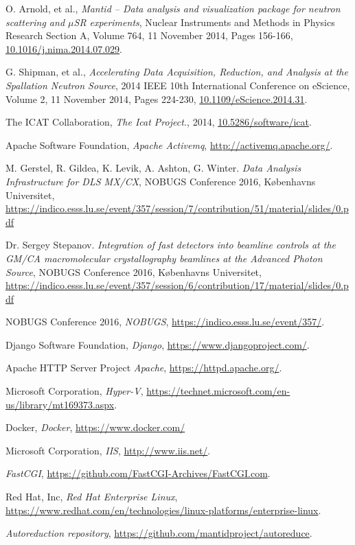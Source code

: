 \documentclass[twocolumn]{article}
\begin{document}
\begin{thebibliography}{99}
    O. Arnold, et al.,
    \emph{Mantid -- Data analysis and visualization package for neutron scattering and $\mu$SR experiments},
    Nuclear Instruments and Methods in Physics Research Section A, Volume 764, 11 November 2014, Pages 156-166,
    \href{http://dx.doi.org/10.1016/j.nima.2014.07.029}{10.1016/j.nima.2014.07.029}.

    G. Shipman, et al.,
    \emph{Accelerating Data Acquisition, Reduction, and Analysis at the Spallation Neutron Source},
    2014 IEEE 10th International Conference on eScience, Volume 2, 11 November 2014, Pages 224-230,
    \href{http://dx.doi.org/10.1109/eScience.2014.31}{10.1109/eScience.2014.31}.
    
    The ICAT Collaboration,
    \emph{The Icat Project.},
    2014,
    \href{https://doi.org/10.5286/SOFTWARE/ICAT}{10.5286/software/icat}.
    
    Apache Software Foundation,
    \emph{Apache Activemq},
    \url{http://activemq.apache.org/}.

	M. Gerstel, R. Gildea, K. Levik, A. Ashton, G. Winter.
	\emph{Data Analysis Infrastructure for DLS MX/CX},
	NOBUGS Conference 2016, Københavns Universitet,
	\url{https://indico.esss.lu.se/event/357/session/7/contribution/51/material/slides/0.pdf}

	Dr. Sergey Stepanov.
	\emph{Integration of fast detectors into beamline controls at the GM/CA macromolecular crystallography beamlines at the Advanced Photon Source},
	NOBUGS Conference 2016, Københavns Universitet,
	\url{https://indico.esss.lu.se/event/357/session/6/contribution/17/material/slides/0.pdf}

	NOBUGS Conference 2016,
	\emph{NOBUGS},
	\url{https://indico.esss.lu.se/event/357/}.
    
    Django Software Foundation,
    \emph{Django},
    \url{https://www.djangoproject.com/}.

	Apache HTTP Server Project
	\emph{Apache},
	\url{https://httpd.apache.org/}.
    
    Microsoft Corporation,
    \emph{Hyper-V},
    \url{https://technet.microsoft.com/en-us/library/mt169373.aspx}.

	Docker,
	\emph{Docker},
	\url{https://www.docker.com/}

    Microsoft Corporation,
    \emph{IIS},
    \url{http://www.iis.net/}.
    
    \emph{FastCGI},
    \url{https://github.com/FastCGI-Archives/FastCGI.com}.
    
    Red Hat, Inc,
    \emph{Red Hat Enterprise Linux},
    \url{https://www.redhat.com/en/technologies/linux-platforms/enterprise-linux}.
    
    \emph{Autoreduction repository},
    \url{https://github.com/mantidproject/autoreduce}.

    
\end{thebibliography}
\end{document}
